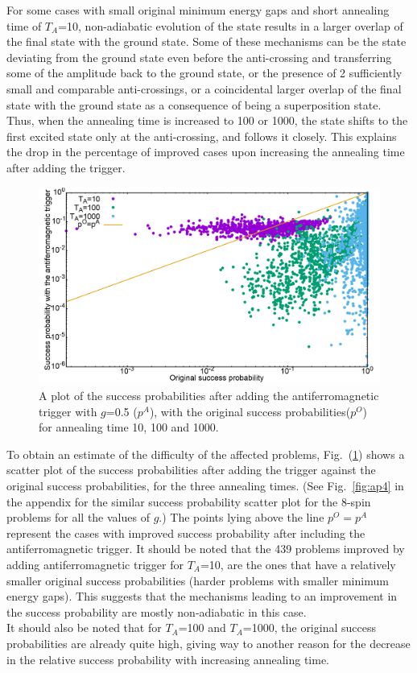 \documentclass[../main.tex]{subfiles}
\begin{document}
For some cases with small original minimum energy gaps and short annealing time of $T_A$=10, non-adiabatic evolution of the state results in a larger overlap of the final state with the ground state. Some of these mechanisms can be the state deviating from the ground state even before the anti-crossing and transferring some of the amplitude back to the ground state, or the presence of 2 sufficiently small and comparable anti-crossings, or a coincidental larger overlap of the final state with the ground state as a consequence of being a superposition state. Thus, when the annealing time is increased to 100 or 1000, the state shifts to the first excited state only at the anti-crossing, and follows it closely. This explains the drop in the percentage of improved cases upon increasing the annealing time after adding the trigger. 


\begin{figure}
\centering 
\includegraphics[scale=0.24]{ProbScat_g0.png}
\caption{A plot of the success probabilities after adding the antiferromagnetic trigger with $g$=0.5 ($p^A$), with the original success probabilities($p^O$) for annealing time 10, 100 and 1000.}
\label{fig:a14}
\end{figure}

To obtain an estimate of the difficulty of the affected problems, Fig.~(\ref{fig:a14}) shows a scatter plot of the success probabilities after adding the trigger against the original success probabilities, for the three annealing times. (See Fig.~\ref{fig:ap4} in the appendix for the similar success probability scatter plot for the 8-spin problems for all the values of $g$.) The points lying above the line $p^O=p^A$ represent the cases with improved success probability after including the antiferromagnetic trigger. It should be noted that the 439 problems improved by adding antiferromagnetic trigger for $T_A$=10, are the ones that have a relatively smaller original success probabilities (harder problems with smaller minimum energy gaps). This suggests that the mechanisms leading to an improvement in the success probability are mostly non-adiabatic in this case.\\
It should also be noted that for $T_A$=100 and $T_A$=1000, the original success probabilities are already quite high, giving way to another reason for the decrease in the relative success probability with increasing annealing time. \\
\end{document}
